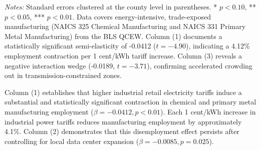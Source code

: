 \documentclass[11pt,a4paper]{article}
\begin{document}
\begin{table}[htbp]
\centering
\small
\caption{The Industrial Crowding-Out Effect: Impact of Power Tariff Shocks on Manufacturing}
\label{tab:table3_crowdout}
\begin{minipage}{\linewidth}
\vspace{1ex}
\footnotesize \textit{Notes:} Standard errors clustered at the county level in parentheses. * $p<0.10$, ** $p<0.05$, *** $p<0.01$. Data covers energy-intensive, trade-exposed manufacturing (NAICS 325 Chemical Manufacturing and NAICS 331 Primary Metal Manufacturing) from the BLS QCEW. Column (1) documents a statistically significant semi-elasticity of -0.0412 ($t = -4.90$), indicating a 4.12\% employment contraction per 1 cent/kWh tariff increase. Column (3) reveals a negative interaction wedge (-0.0189, $t = -3.71$), confirming accelerated crowding out in transmission-constrained zones.
\end{minipage}
\end{table}


Column (1) establishes that higher industrial retail electricity tariffs induce a substantial and statistically significant contraction in chemical and primary metal manufacturing employment ($\beta = -0.0412, p < 0.01$). Each 1 cent/kWh increase in industrial power tariffs reduces manufacturing employment by approximately 4.1\%. Column (2) demonstrates that this disemployment effect persists after controlling for local data center expansion ($\beta = -0.0085, p = 0.025$).
\end{document}
